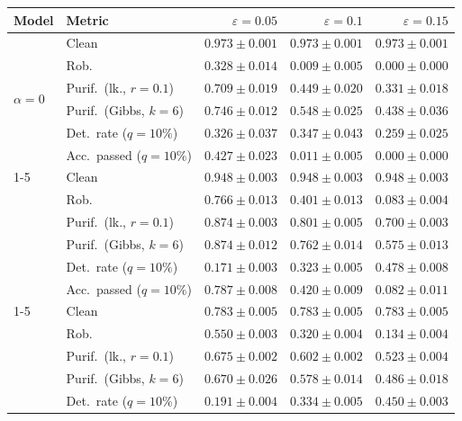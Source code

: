 \begin{table}[htbp]
  \centering
  \small
  \begin{tabular}{@{}llrrr@{}}
    \toprule
    Model & Metric & $\varepsilon=0.05$ & $\varepsilon=0.1$ & $\varepsilon=0.15$ \\
    \midrule
    \multirow{6}{*}{$\alpha{=}0$} & Clean & $\mathbf{0.973 \pm 0.001}$ & $\mathbf{0.973 \pm 0.001}$ & $\mathbf{0.973 \pm 0.001}$ \\
     & Rob. & $0.328 \pm 0.014$ & $0.009 \pm 0.005$ & $0.000 \pm 0.000$ \\
     & Purif.\ (lk., $r{=}0.1$) & $0.709 \pm 0.019$ & $0.449 \pm 0.020$ & $0.331 \pm 0.018$ \\
     & Purif.\ (Gibbs, $k{=}6$) & $0.746 \pm 0.012$ & $0.548 \pm 0.025$ & $0.438 \pm 0.036$ \\
     & Det.\ rate ($q{=}10\%$) & $\mathbf{0.326 \pm 0.037}$ & $\mathbf{0.347 \pm 0.043}$ & $0.259 \pm 0.025$ \\
     & Acc.\ passed ($q{=}10\%$) & $0.427 \pm 0.023$ & $0.011 \pm 0.005$ & $0.000 \pm 0.000$ \\
    \cmidrule(lr){1-5}
    \multirow{6}{*}{$\alpha{=}0.01$} & Clean & $0.948 \pm 0.003$ & $0.948 \pm 0.003$ & $0.948 \pm 0.003$ \\
     & Rob. & $0.766 \pm 0.013$ & $0.401 \pm 0.013$ & $0.083 \pm 0.004$ \\
     & Purif.\ (lk., $r{=}0.1$) & $\mathbf{0.874 \pm 0.003}$ & $0.801 \pm 0.005$ & $0.700 \pm 0.003$ \\
     & Purif.\ (Gibbs, $k{=}6$) & $\mathbf{0.874 \pm 0.012}$ & $0.762 \pm 0.014$ & $0.575 \pm 0.013$ \\
     & Det.\ rate ($q{=}10\%$) & $0.171 \pm 0.003$ & $0.323 \pm 0.005$ & $\mathbf{0.478 \pm 0.008}$ \\
     & Acc.\ passed ($q{=}10\%$) & $0.787 \pm 0.008$ & $0.420 \pm 0.009$ & $0.082 \pm 0.011$ \\
    \cmidrule(lr){1-5}
    \multirow{6}{*}{$\alpha{=}0.1$} & Clean & $0.783 \pm 0.005$ & $0.783 \pm 0.005$ & $0.783 \pm 0.005$ \\
     & Rob. & $0.550 \pm 0.003$ & $0.320 \pm 0.004$ & $0.134 \pm 0.004$ \\
     & Purif.\ (lk., $r{=}0.1$) & $0.675 \pm 0.002$ & $0.602 \pm 0.002$ & $0.523 \pm 0.004$ \\
     & Purif.\ (Gibbs, $k{=}6$) & $0.670 \pm 0.026$ & $0.578 \pm 0.014$ & $0.486 \pm 0.018$ \\
     & Det.\ rate ($q{=}10\%$) & $0.191 \pm 0.004$ & $0.334 \pm 0.005$ & $0.450 \pm 0.003$ \\

\end{tabular}
\end{table}
